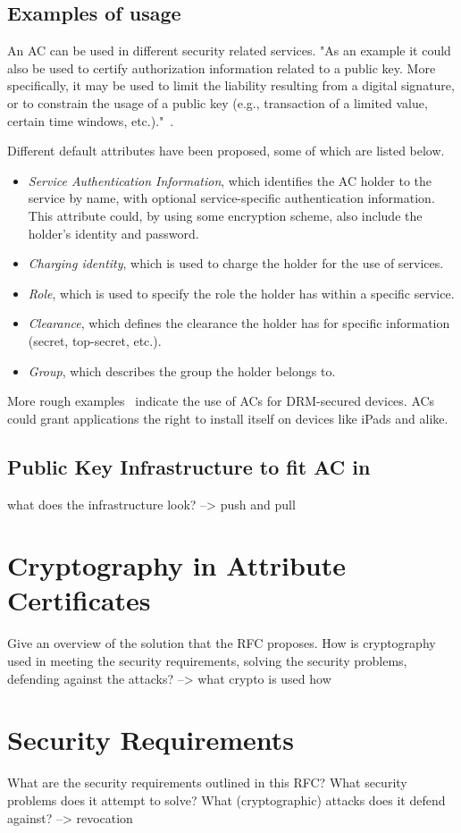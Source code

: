 \documentclass[10pt,conference,a4paper]{IEEEtran}
\begin{document}
\subsection{Examples of usage}
An AC can be used in different security related services. "As an example it could also be used to certify authorization information related to a public key. More specifically, it may be used to limit the liability resulting from a digital signature, or to constrain the usage of a public key (e.g., transaction of a limited value, certain time windows, etc.)."~\cite{tilborg2011encyclopedia}.

Different default attributes have been proposed, some of which are listed below.~\cite{benantar2006access,rfc_ac}
\begin{itemize}
	\item \textit{Service Authentication Information}, which identifies the AC holder to the service by name, with optional service-specific authentication information. This attribute could, by using some encryption scheme, also include the holder's identity and password.
	\item \textit{Charging identity}, which is used to charge the holder for the use of services.
	\item \textit{Role}, which is used to specify the role the holder has within a specific service.
	\item \textit{Clearance}, which defines the clearance the holder has for specific information (secret, top-secret, etc.).
	\item \textit{Group}, which describes the group the holder belongs to.
\end{itemize}

More rough examples~\cite{tilborg2011encyclopedia} indicate the use of ACs for DRM-secured devices. ACs could grant applications the right to install itself on devices like iPads and alike.

\subsection{Public Key Infrastructure to fit AC in}
what does the infrastructure look? --> push and pull

\section{Cryptography in Attribute Certificates}
\label{cryptography_in_ac}
Give an overview of the solution that the RFC proposes. How is cryptography used in meeting the security requirements, solving the security problems, defending against the attacks?
--> what crypto is used how

\section{Security Requirements}
\label{security_requirements}
What are the security requirements outlined in this RFC? What security problems does it attempt to solve? What (cryptographic) attacks does it defend against?
--> revocation



\end{document}
